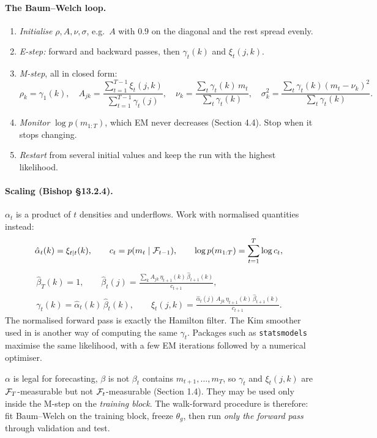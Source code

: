 \paragraph{The Baum--Welch loop.}
\begin{enumerate}
  \item \emph{Initialise} $\rho,A,\nu,\sigma$, e.g.\ $A$ with $0.9$ on the diagonal and the rest spread evenly.
  \item \emph{E-step:} forward and backward passes, then $\gamma_t(k)$ and $\xi_t(j,k)$.
  \item \emph{M-step}, all in closed form:
  \begin{equation}
  \rho_k=\gamma_1(k),\quad A_{jk}=\frac{\sum_{t=1}^{T-1}\xi_t(j,k)}{\sum_{t=1}^{T-1}\gamma_t(j)},\quad\nu_k=\frac{\sum_t\gamma_t(k)\,m_t}{\sum_t\gamma_t(k)},\quad\sigma_k^2=\frac{\sum_t\gamma_t(k)(m_t-\nu_k)^2}{\sum_t\gamma_t(k)}.
  \end{equation}
  \item \emph{Monitor} $\log p(m_{1:T})$, which EM never decreases (Section 4.4). Stop when it stops changing.
  \item \emph{Restart} from several initial values and keep the run with the highest likelihood.
\end{enumerate}

\paragraph{Scaling (Bishop \S13.2.4).} $\alpha_t$ is a product of $t$ densities and underflows. Work with normalised quantities instead:
\begin{equation}
\hat\alpha_t(k)=\xi_{t\mid t}(k),\qquad c_t=p(m_t\mid\mathcal{F}_{t-1}),\qquad\log p(m_{1:T})=\sum_{t=1}^T\log c_t,
\end{equation}
\begin{gather}
\hat\beta_T(k)=1,\qquad\hat\beta_t(j)=\frac{\sum_kA_{jk}\,\eta_{t+1}(k)\,\hat\beta_{t+1}(k)}{c_{t+1}},\\
\gamma_t(k)=\hat\alpha_t(k)\,\hat\beta_t(k),\qquad\xi_t(j,k)=\frac{\hat\alpha_t(j)\,A_{jk}\,\eta_{t+1}(k)\,\hat\beta_{t+1}(k)}{c_{t+1}}.
\end{gather}
The normalised forward pass is exactly the Hamilton filter. The Kim smoother used in  is another way of computing the same $\gamma_t$. Packages such as \texttt{statsmodels} maximise the same likelihood, with a few EM iterations followed by a numerical optimiser.

\begin{warnbox}{$\alpha$ is legal for forecasting, $\beta$ is not}
$\beta_t$ contains $m_{t+1},\dots,m_T$, so $\gamma_t$ and $\xi_t(j,k)$ are $\mathcal{F}_T$-measurable but not $\mathcal{F}_t$-measurable (Section 1.4). They may be used only inside the M-step on the \emph{training block}. The walk-forward procedure is therefore: fit Baum--Welch on the training block, freeze $\theta_g$, then run \emph{only the forward pass} through validation and test.
\end{warnbox}

